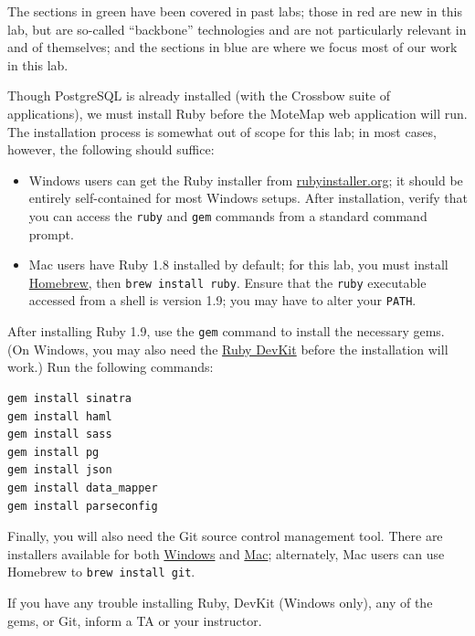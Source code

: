 \documentclass{article}
\begin{document}
The sections in green have been covered in past labs; those in red are new in this lab, but are so-called ``backbone'' technologies and are not particularly relevant in and of themselves; and the sections in blue are where we focus most of our work in this lab.


Though PostgreSQL is already installed (with the Crossbow suite of applications), we must install Ruby before the MoteMap web application will run. The installation process is somewhat out of scope for this lab; in most cases, however, the following should suffice:

\begin{itemize}
\item Windows users can get the Ruby installer from \href{http://rubyinstaller.org/}{rubyinstaller.org}; it should be entirely self-contained for most Windows setups. After installation, verify that you can access the \verb!ruby! and \verb!gem! commands from a standard command prompt.
\item Mac users have Ruby 1.8 installed by default; for this lab, you must install \href{http://mxcl.github.com/homebrew/}{Homebrew}, then \verb!brew install ruby!. Ensure that the \verb!ruby! executable accessed from a shell is version 1.9; you may have to alter your \verb!PATH!.
\end{itemize}

After installing Ruby 1.9, use the \verb!gem! command to install the necessary gems. (On Windows, you may also need the \href{http://rubyinstaller.org/add-ons/devkit/}{Ruby DevKit} before the installation will work.) Run the following commands:

\begin{verbatim}
gem install sinatra
gem install haml
gem install sass
gem install pg
gem install json
gem install data_mapper
gem install parseconfig
\end{verbatim}

Finally, you will also need the Git source control management tool. There are installers available for both \href{http://msysgit.github.com/}{Windows} and \href{http://code.google.com/p/git-osx-installer/}{Mac}; alternately, Mac users can use Homebrew to \verb!brew install git!.

If you have any trouble installing Ruby, DevKit (Windows only), any of the gems, or Git, inform a TA or your instructor.

\end{document}
